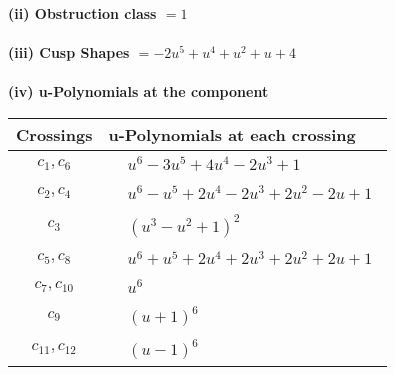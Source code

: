 \documentclass[1p]{elsarticle_modified}
\theoremstyle{definition}
\begin{document}
\flushleft \textbf{(ii) Obstruction class $= 1$}\\~\\
\flushleft \textbf{(iii) Cusp Shapes $= -2 u^5+u^4+u^2+u+4$}\\~\\
\newpage\renewcommand{\arraystretch}{1}
\flushleft \textbf{(iv) u-Polynomials at the component}\newline \\
\begin{tabular}{m{50pt}|m{274pt}}
Crossings & \hspace{64pt}u-Polynomials at each crossing \\
\hline $$\begin{aligned}c_{1},c_{6}\end{aligned}$$&$\begin{aligned}
&u^6-3 u^5+4 u^4-2 u^3+1
\end{aligned}$\\
\hline $$\begin{aligned}c_{2},c_{4}\end{aligned}$$&$\begin{aligned}
&u^6- u^5+2 u^4-2 u^3+2 u^2-2 u+1
\end{aligned}$\\
\hline $$\begin{aligned}c_{3}\end{aligned}$$&$\begin{aligned}
&(u^3- u^2+1)^2
\end{aligned}$\\
\hline $$\begin{aligned}c_{5},c_{8}\end{aligned}$$&$\begin{aligned}
&u^6+u^5+2 u^4+2 u^3+2 u^2+2 u+1
\end{aligned}$\\
\hline $$\begin{aligned}c_{7},c_{10}\end{aligned}$$&$\begin{aligned}
&u^6
\end{aligned}$\\
\hline $$\begin{aligned}c_{9}\end{aligned}$$&$\begin{aligned}
&(u+1)^6
\end{aligned}$\\
\hline $$\begin{aligned}c_{11},c_{12}\end{aligned}$$&$\begin{aligned}
&(u-1)^6
\end{aligned}$\\
\hline
\end{tabular}\\~\\
\end{document}
